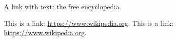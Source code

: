 A link with text: \href{www.wikipedia.org}{the free encyclopedia}


This is a link: \href{https://www.wikipedia.org}{https://www.wikipedia.org}. This is a link: \href{https://www.wikipedia.org}{https://www.wikipedia.org}.

